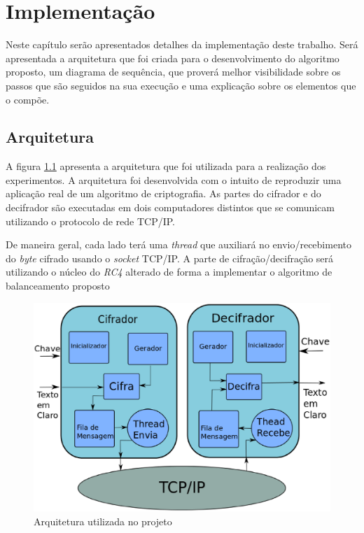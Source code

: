 \chapter{Implementação}
\label{implementation-algorithm}

Neste capítulo serão apresentados detalhes da implementação deste trabalho. Será apresentada a arquitetura que foi criada para o desenvolvimento do algoritmo proposto, um diagrama de sequência, que proverá melhor visibilidade sobre os passos que são seguidos na sua execução e uma explicação sobre os elementos que o compõe.

\section{Arquitetura}

A figura \ref{architecture} apresenta a arquitetura que foi utilizada para a realização dos experimentos. A arquitetura foi desenvolvida com o intuito de reproduzir uma aplicação real de um algoritmo de criptografia. As partes do cifrador e do decifrador são executadas em dois computadores distintos que se comunicam utilizando o protocolo de rede TCP/IP.

De maneira geral, cada lado terá uma \textit{thread} que auxiliará no envio/recebimento do \textit{byte} cifrado usando o \textit{socket} TCP/IP. A parte de cifração/decifração será utilizando o núcleo do \textit{RC4} alterado de forma a implementar o algoritmo de balanceamento proposto

\begin{figure}[h]
	\centering
	\includegraphics[scale=0.5]{figuras/architecture.eps}
	\caption{Arquitetura utilizada no projeto}
	\label{architecture}
\end{figure}

